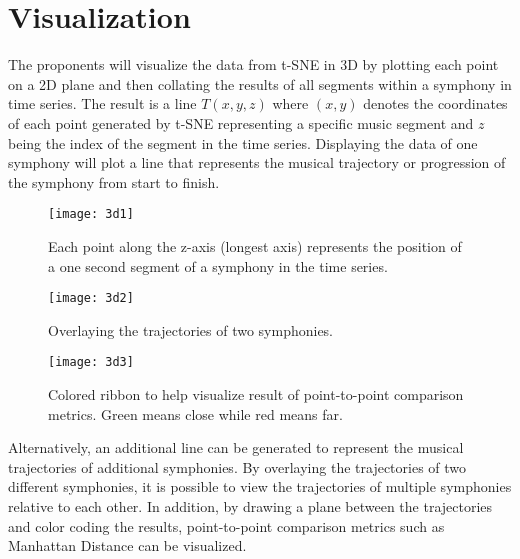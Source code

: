 \section{Visualization}
The proponents will visualize the data from t-SNE in 3D by plotting each point on a 2D plane and then collating the results of all segments within a symphony in time series. The result is a line $T (x, y, z)$ where $(x, y)$ denotes the coordinates of each point generated by t-SNE representing a specific music segment and $z$ being the index of the segment in the time series. Displaying the data of one symphony will plot a line that represents the musical trajectory or progression of the symphony from start to finish.

\begin{figure}[H]
\caption{Each point along the z-axis (longest axis) represents the position of a one second segment of a symphony in the time series.}
\centering
\texttt{[image: 3d1]}
\end{figure}

\begin{figure}[H]
\caption{Overlaying the trajectories of two symphonies.}
\centering
\texttt{[image: 3d2]}
\end{figure}

\begin{figure}[H]
\caption{Colored ribbon to help visualize result of point-to-point comparison metrics. Green means close while red means far.}
\centering
\texttt{[image: 3d3]}
\end{figure}

Alternatively, an additional line can be generated to represent the musical trajectories of additional symphonies. By overlaying the trajectories of two different symphonies, it is possible to view the trajectories of multiple symphonies relative to each other. In addition, by drawing a plane between the trajectories and color coding the results, point-to-point comparison metrics such as Manhattan Distance can be visualized.
